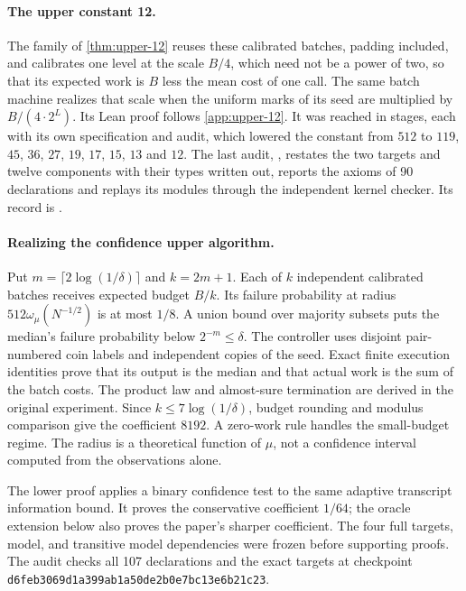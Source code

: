 \paragraph{The upper constant 12.}
The family of \cref{thm:upper-12} reuses these calibrated batches,
padding included, and calibrates one level at the scale $B/4$, which need
not be a power of two, so that its expected work is $B$ less the mean cost of
one call. The same batch
machine realizes that scale when the uniform marks of its seed are
multiplied by $B/(4\cdot2^L)$. Its Lean proof follows \cref{app:upper-12}.
It was reached in stages, each with its own specification and audit, which
lowered the constant from $512$ to $119$, $45$, $36$, $27$, $19$, $17$,
$15$, $13$ and $12$. The last audit, ,
restates the two targets and twelve components with their types written
out, reports the axioms of 90 declarations and replays its modules through
the independent kernel checker. Its record is
.

\paragraph{Realizing the confidence upper algorithm.}
Put $m=\lceil2\log(1/\delta)\rceil$ and $k=2m+1$. Each of $k$ independent
calibrated batches receives expected budget $B/k$. Its failure probability
at radius $512\omega_\mu(N^{-1/2})$ is at most $1/8$. A union bound over
majority subsets puts the median's failure probability below $2^{-m}\le\delta$.
The controller uses disjoint pair-numbered coin labels and independent
copies of the seed. Exact finite execution identities prove that its
output is the median and that actual work is the sum of the batch costs.
The product law and almost-sure termination are derived in the original
experiment. Since $k\le7\log(1/\delta)$, budget rounding and modulus
comparison give the coefficient $8192$. A zero-work rule handles the
small-budget regime. The radius is a theoretical function of $\mu$, not
a confidence interval computed from the observations alone.

The lower proof applies a binary confidence test to the same adaptive
transcript information bound. It proves the conservative coefficient
$1/64$; the oracle extension below also proves the paper's sharper
coefficient. The four full targets, model, and transitive model
dependencies were frozen before supporting proofs. The audit checks
all 107 declarations and the exact targets at checkpoint
\nolinkurl{d6feb3069d1a399ab1a50de2b0e7bc13e6b21c23}.

